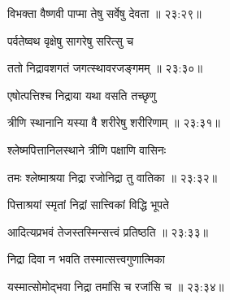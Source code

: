 
{\devanagarifont विभक्ता वैष्णवी पाप्मा तेषु सर्वेषु देवता {॥ २३:२९॥} \veg\dontdisplaylinenum }%
 
{\devanagarifont पर्वतेष्वथ वृक्षेषु सागरेषु सरित्सु च \thinspace{\dandab} \dontdisplaylinenum }%
 

{\devanagarifont ततो निद्रावशगतं जगत्स्थावरजङ्गमम् {॥ २३:३०॥} \veg\dontdisplaylinenum }%
 
{\devanagarifont एषोत्पत्तिश्च निद्राया यथा वसति तच्छृणु \thinspace{\dandab} \dontdisplaylinenum }%
 

{\devanagarifont त्रीणि स्थानानि यस्या वै शरीरेषु शरीरिणाम् {॥ २३:३१॥} \veg\dontdisplaylinenum }%
 
{\devanagarifont श्लेष्मपित्तानिलस्थाने त्रीणि पक्षाणि वासिनः \thinspace{\dandab} \dontdisplaylinenum }%


{\devanagarifont तमः श्लेष्माश्रया निद्रा रजोनिद्रा तु वातिका {॥ २३:३२॥} \veg\dontdisplaylinenum }%

{\devanagarifont पित्ताश्रयां स्मृतां निद्रां सात्त्विकां विद्धि भूपते \thinspace{\dandab} \dontdisplaylinenum }%


{\devanagarifont आदित्यप्रभवं तेजस्तस्मिन्सत्त्वं प्रतिष्ठति {॥ २३:३३॥} \veg\dontdisplaylinenum }%

{\devanagarifont निद्रा दिवा न भवति तस्मात्सत्त्वगुणात्मिका \thinspace{\dandab} \dontdisplaylinenum }%
 

{\devanagarifont यस्मात्सोमोद्भवा निद्रा तमांसि च रजांसि च {॥ २३:३४॥} \veg\dontdisplaylinenum }%

